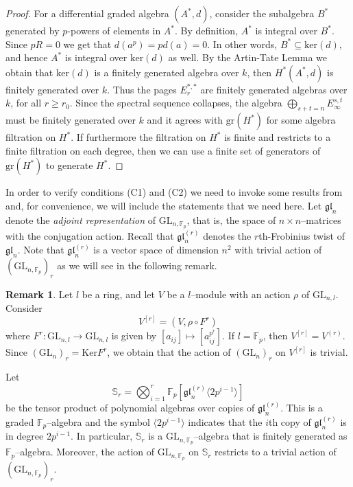 \documentclass{article}
\theoremstyle{plain}
\theoremstyle{definition}
\newtheorem{Rem}[Th]{Remark}
\newcommand{\GL}{\mathrm{GL}}
\begin{document}
\begin{proof}
    For a differential graded algebra $(A^\ast,d)$, consider the subalgebra $B^\ast$ generated by $p$-powers of elements in $A^\ast$. By definition, $A^\ast$ is integral over $B^\ast$. Since $pR=0$ we get that $d(a^p)=pd(a)=0$. In other words, $B^\ast\subseteq \mathrm{ker}(d)$, and hence $A^\ast$ is integral over $\mathrm{ker}(d)$ as well. By the Artin-Tate Lemma we obtain that $\mathrm{ker}(d)$ is a finitely generated algebra over $k$, then $H^\ast(A^\ast,d)$ is finitely generated over $k$. Thus the pages $E_r^{\ast,\ast}$ are finitely generated algebras over $k$, for all $r\geq r_0$. Since the spectral sequence collapses, the algebra $\bigoplus_{s+t=n}E^{s,t}_\infty$ must be finitely generated over $k$ and it agrees with $\mathrm{gr}(H^\ast)$ for some algebra filtration on $H^\ast$. If furthermore the filtration on $H^\ast$ is finite and restricts to a finite filtration on each degree, then we can use a finite set of generators of $\mathrm{gr}(H^\ast)$ to generate $H^\ast$. 
\end{proof}

In order to verify conditions (C1) and (C2) we need to invoke some results from \cite{FS97} and, for convenience, we will include the statements that we need here. Let $\mathfrak{gl}_n$ denote the \textit{adjoint representation} of $\GL_{n,{\mathbb{F}_p}}$, that is, the space of $n\times n$--matrices with the conjugation action. Recall that $\mathfrak{gl}_n^{(r)}$ denotes the $r$th-Frobinius twist of $\mathfrak{gl}_n$. Note that $\mathfrak{gl}_n^{(r)}$ is a vector space of dimension $n^2$ with trivial action of $(\GL_{n,{\mathbb{F}_p}})_r$ as we will see in the following remark. 

\begin{Rem}
Let  $l$ be a ring, and let $V$ be a $l$--module with an action $\rho$ of $\GL_{n,l}$. Consider \[
V^{[r]}=(V,\rho\circ F^r)
\] 
where $F^r\colon \GL_{n,l}\to \GL_{n,l}$ is given by $[a_{ij}]\mapsto [a_{ij}^{p^r}]$. If $l=\mathbb{F}_p$, then $V^{[r]}=V^{(r)}$. Since $(\GL_n)_r=\mathrm{Ker}F^r$, we obtain that the action of $(\GL_n)_r$ on $V^{[r]}$  is trivial.    
\end{Rem}


 


Let  
\[
\mathbb{S}_r=\bigotimes_{i=1}^r \mathbb{F}_p[\mathfrak{gl}_n^{(r)}\langle 2p^{i-1}\rangle]
\]
be the tensor product of polynomial algebras over copies of $\mathfrak{gl}_n^{(r)}$. This is a  graded $\mathbb{F}_p$--algebra and the symbol $\langle 2p^{i-1}\rangle$ indicates that the $i$th copy of $\mathfrak{gl}_n^{(r)}$ is in degree $2p^{i-1}$. In particular, $\mathbb{S}_r$ is a $\GL_{n,{\mathbb{F}_p}}$--algebra that is finitely generated as $\mathbb{F}_p$--algebra. Moreover, the action of $\GL_{n,{\mathbb{F}_p}}$ on $\mathbb{S}_r$ restricts to a trivial action of $(\GL_{n,{\mathbb{F}_p}})_r$.
\end{document}
